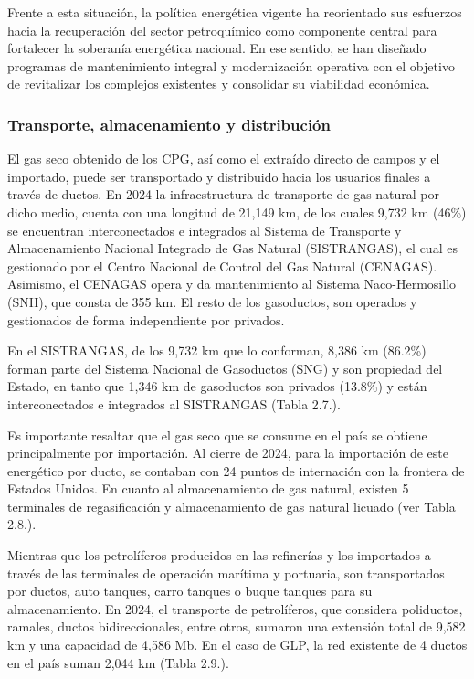 \documentclass{sener2025}
\begin{document}
Frente a esta situación, la política energética vigente ha reorientado sus esfuerzos hacia la recuperación del sector petroquímico como componente central para fortalecer la soberanía energética nacional. En ese sentido, se han diseñado programas de mantenimiento integral y modernización operativa con el objetivo de revitalizar los complejos existentes y consolidar su viabilidad económica.


\subsubsection{Transporte, almacenamiento y distribución}

El gas seco obtenido de los CPG, así como el extraído directo de campos y el importado, puede ser transportado y distribuido hacia los usuarios finales a través de ductos. En 2024 la infraestructura de transporte de gas natural por dicho medio, cuenta con una longitud de 21,149 km, de los cuales 9,732 km (46\%) se encuentran interconectados e integrados al Sistema de Transporte y Almacenamiento Nacional Integrado de Gas Natural (SISTRANGAS), el cual es gestionado por el Centro Nacional de Control del Gas Natural (CENAGAS). Asimismo, el CENAGAS opera y da mantenimiento al Sistema Naco-Hermosillo (SNH), que consta de 355 km. El resto de los gasoductos, son operados y gestionados de forma independiente por privados.

En el SISTRANGAS, de los 9,732 km que lo conforman, 8,386 km (86.2\%) forman parte del Sistema Nacional de Gasoductos (SNG) y son propiedad del Estado, en tanto que 1,346 km de gasoductos son privados (13.8\%) y están interconectados e integrados al SISTRANGAS (Tabla 2.7.).

Es importante resaltar que el gas seco que se consume en el país se obtiene principalmente por importación. Al cierre de 2024, para la importación de este energético por ducto, se contaban con 24 puntos de internación con la frontera de Estados Unidos. En cuanto al almacenamiento de gas natural, existen 5 terminales de regasificación y almacenamiento de gas natural licuado (ver Tabla 2.8.).

Mientras que los petrolíferos producidos en las refinerías y los importados a través de las terminales de operación marítima y portuaria, son transportados por ductos, auto tanques, carro tanques o buque tanques para su almacenamiento. En 2024, el transporte de petrolíferos, que considera poliductos, ramales, ductos bidireccionales, entre otros, sumaron una extensión total de 9,582 km y una capacidad de 4,586 Mb. En el caso de GLP, la red existente de 4 ductos en el país suman 2,044 km (Tabla 2.9.).
\end{document}
